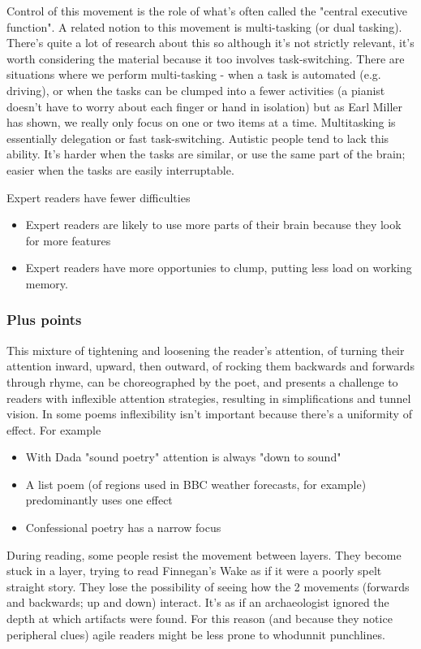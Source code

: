 \documentclass[11pt]{article}
\begin{document}
Control of this movement is the role of what's often called the "central
executive function". A related notion to this movement is multi-tasking (or dual tasking). There's quite a lot of
research about this so although it's not strictly relevant, it's worth
considering the material because it too involves task-switching. There are 
situations where we perform multi-tasking - when a task is automated
(e.g. driving), or when the tasks
can be clumped into a fewer
activities (a pianist doesn't have to worry about each finger or hand in
isolation) but as Earl Miller has shown,
we really only focus on one or two items at a time. Multitasking is essentially
delegation or  fast task-switching. Autistic people tend to lack this ability. 
It's harder when the tasks are similar, or use the same part of the brain;
 easier when the tasks are easily interruptable.



Expert readers have fewer difficulties
\begin{itemize}
\item Expert readers are likely to use more parts of their brain because
they look for more features
\item Expert readers have more opportunies to clump, putting less load on
  working memory.
\end{itemize}

\subsubsection*{Plus points}


This mixture of tightening
and loosening the reader's attention, of turning their attention inward, upward,
then outward, of rocking them backwards and forwards through rhyme, can be
choreographed by the poet, and presents a challenge to readers with inflexible
attention strategies, resulting in simplifications and tunnel vision.
In some poems inflexibility isn't important because there's a uniformity of effect. For example
\begin{itemize}
\item With Dada "sound poetry" attention is always "down to sound"
\item A list poem (of regions used in BBC weather forecasts, for example) predominantly
uses one effect
\item Confessional poetry has a narrow focus
\end{itemize}

During reading, some people resist the movement between layers. 
They become stuck in a layer, trying to read Finnegan's Wake as if it were
a poorly spelt straight story. They lose the possibility of seeing how the 2 movements 
(forwards and backwards; up and down) interact. It's as if an archaeologist 
ignored the depth at which artifacts were found. For this reason (and because they
  notice peripheral clues) agile readers might be less prone to whodunnit
  punchlines.
\end{document}
